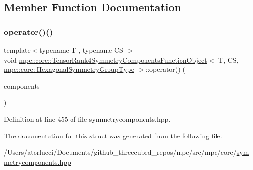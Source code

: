 \subsection{Member Function Documentation}
\mbox{\label{structmpc_1_1core_1_1_tensor_rank4_symmetry_components_function_object_3_01_t_00_01_c_s_00_01mpc53006a57374f233daf45c7959ab92c1e_a23417bd745bf260bd660d1d377050273}} 
\subsubsection{\texorpdfstring{operator()()}{operator()()}}
{\footnotesize\ttfamily template$<$typename T , typename CS $>$ \\
void \mbox{\hyperlink{structmpc_1_1core_1_1_tensor_rank4_symmetry_components_function_object}{mpc\+::core\+::\+Tensor\+Rank4\+Symmetry\+Components\+Function\+Object}}$<$ T, CS, \mbox{\hyperlink{structmpc_1_1core_1_1_hexagonal_symmetry_group_type}{mpc\+::core\+::\+Hexagonal\+Symmetry\+Group\+Type}} $>$\+::operator() (\begin{DoxyParamCaption}\item[{std\+::set$<$ \mbox{\hyperlink{classmpc_1_1core_1_1_tensor_rank_n_component}{mpc\+::core\+::\+Tensor\+Rank\+N\+Component}}$<$ T, 4 $>$ $>$ \&}]{components }\end{DoxyParamCaption})\hspace{0.3cm}{\ttfamily [inline]}}



Definition at line 455 of file symmetrycomponents.\+hpp.



The documentation for this struct was generated from the following file\+:\begin{DoxyCompactItemize}
\item 
/\+Users/atorlucci/\+Documents/github\+\_\+threecubed\+\_\+repos/mpc/src/mpc/core/\mbox{\hyperlink{symmetrycomponents_8hpp}{symmetrycomponents.\+hpp}}\end{DoxyCompactItemize}
